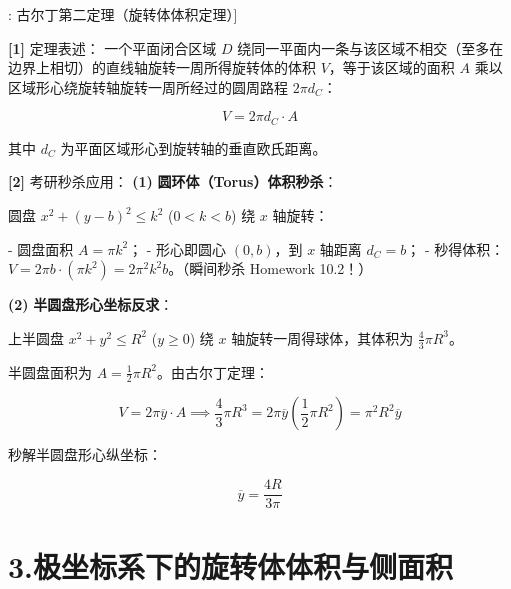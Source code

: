 \documentclass[11pt,a4paper,UTF8]{ctexart}
\begin{document}
\begin{thmbox}[模型[4]: 古尔丁第二定理（旋转体体积定理）]

\textbf{[1]} 定理表述：
一个平面闭合区域 $D$ 绕同一平面内一条与该区域不相交（至多在边界上相切）的直线轴旋转一周所得旋转体的体积 $V$，等于该区域的面积 $A$ 乘以区域形心绕旋转轴旋转一周所经过的圆周路程 $2\pi d_C$：


\begin{equation*}
V = 2\pi d_C \cdot A
\end{equation*}


其中 $d_C$ 为平面区域形心到旋转轴的垂直欧氏距离。

\textbf{[2]} 考研秒杀应用：
\textbf{(1)}  \textbf{圆环体（Torus）体积秒杀}：

圆盘 $x^2 + (y-b)^2 \leqslant k^2$ ($0 < k < b$) 绕 $x$ 轴旋转：

- 圆盘面积 $A = \pi k^2$；
- 形心即圆心 $(0, b)$，到 $x$ 轴距离 $d_C = b$；
- 秒得体积：$V = 2\pi b \cdot (\pi k^2) = 2\pi^2 k^2 b$。（瞬间秒杀 Homework 10.2！）

\textbf{(2)}  \textbf{半圆盘形心坐标反求}：

上半圆盘 $x^2+y^2 \leqslant R^2$ ($y \geqslant 0$) 绕 $x$ 轴旋转一周得球体，其体积为 $\frac{4}{3}\pi R^3$。

半圆盘面积为 $A = \frac{1}{2}\pi R^2$。由古尔丁定理：


\begin{equation*}
V = 2\pi \overline{y} \cdot A \implies \frac{4}{3}\pi R^3 = 2\pi \overline{y} \left(\frac{1}{2}\pi R^2\right) = \pi^2 R^2 \overline{y}
\end{equation*}


秒解半圆盘形心纵坐标：


\begin{equation*}
\overline{y} = \frac{4R}{3\pi}
\end{equation*}


\end{thmbox}

\section{3.极坐标系下的旋转体体积与侧面积}
\end{document}
